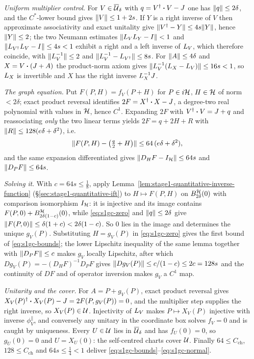 \emph{Uniform multiplier control.} For $V\in\overline{\mathcal U}_{\delta}$ with $q=V^{\dagger}\mathbin{\bm{\cdot}} V-J$ one has
$\lVert q\rVert\le2\delta$, and the $C^*$-lower bound gives $\lVert V\rVert\le1+2s$. If $Y$ is a right
inverse of $V$ then approximate associativity and exact unitality give
$\lVert V^{\dagger}-Y\rVert\le4s\lVert Y\rVert$, hence $\lVert Y\rVert\le2$; the two Neumann estimates
$\lVert L_{V}L_{Y}-I\rVert<1$ and $\lVert L_{V^{\dagger}}L_{V}-I\rVert\le4s<1$ exhibit a right and a
left inverse of $L_{V}$, which therefore coincide, with $\lVert L_{V}^{-1}\rVert\le2$ and
$\lVert L_{V}^{-1}-L_{V^{\dagger}}\rVert\le8s$. For $\lVert A\rVert\le4\delta$ and $X=V\mathbin{\bm{\cdot}}(J+A)$ the
product-norm axiom gives $\lVert L_{V}^{-1}(L_{X}-L_{V})\rVert\le16s<1$, so $L_{X}$ is
invertible and $X$ has the right inverse $L_{X}^{-1}J$.

\emph{The graph equation.} Put $F(P,H)=f_V(P+H)$ for $P\in i\mathcal H$, $H\in\mathcal H$ of norm
$<2\delta$; exact product reversal identifies $2F=X^{\dagger}\mathbin{\bm{\cdot}} X-J$, a degree-two real
polynomial with values in $\mathcal H$, hence $C^{1}$. Expanding $2F$ with $V^{\dagger}\mathbin{\bm{\cdot}} V=J+q$ and
reassociating \emph{only} the two linear terms yields $2F=q+2H+R$ with
$\lVert R\rVert\le128(e\delta+\delta^{2})$, i.e.
\begin{equation}\label{eq:s1gc-zero}
  \lVert F(P,H)-\bigl(\tfrac{q}{2}+H\bigr)\rVert\le 64\,(e\delta+\delta^{2}),
\end{equation}
and the same expansion differentiated gives $\lVert D_HF-I_{\mathcal H}\rVert\le64s$ and
$\lVert D_PF\rVert\le64s$.

\emph{Solving it.} With $c=64s\le\tfrac18$, apply
Lemma~\ref{lem:stage1-quantitative-inverse-function} (\S\ref{sec:stage1-quantitative-ift})
to $H\mapsto F(P,H)$ on $B^{\mathcal H}_{2\delta}(0)$ with comparison isomorphism $I_{\mathcal H}$:
it is injective and its image contains $F(P,0)+B^{\mathcal H}_{2\delta(1-c)}(0)$, while
\eqref{eq:s1gc-zero} and $\lVert q\rVert\le2\delta$ give $\lVert F(P,0)\rVert\le\delta(1+c)<2\delta(1-c)$.
So $0$ lies in the image and determines the unique $g_V(P)$. Substituting $H=g_V(P)$ in
\eqref{eq:s1gc-zero} gives the first bound of \eqref{eq:s1gc-bounds}; the lower Lipschitz
inequality of the same lemma together with $\lVert D_PF\rVert\le c$ makes $g_V$ locally Lipschitz,
after which $Dg_V(P)=-(D_HF)^{-1}D_PF$ gives $\lVert Dg_V(P)\rVert\le c/(1-c)\le2c=128s$ and the
continuity of $DF$ and of operator inversion makes $g_V$ a $C^{1}$ map.

\emph{Unitarity and the cover.} For $A=P+g_V(P)$, exact product reversal gives
$X_V(P)^{\dagger}\mathbin{\bm{\cdot}} X_V(P)-J=2F(P,g_V(P))=0$, and the multiplier step supplies the right
inverse, so $X_V(P)\in\mathcal U$. Injectivity of $L_{V}$ makes $P\mapsto X_V(P)$ injective
with inverse $\phi_V^{\parallel}$, and conversely any unitary in the coordinate box solves
$f_V=0$ and is caught by uniqueness. Every $U\in\mathcal U$ lies in $\overline{\mathcal U}_{\delta}$ and has
$f_U(0)=0$, so $g_U(0)=0$ and $U=X_U(0)$: the self-centred charts cover $\mathcal U$. Finally
$64\le C_{\mathrm{ch}}$, $128\le C_{\mathrm{ch}}$ and $64s\le\tfrac14<1$ deliver
\eqref{eq:s1gc-bounds}--\eqref{eq:s1gc-normal}.

